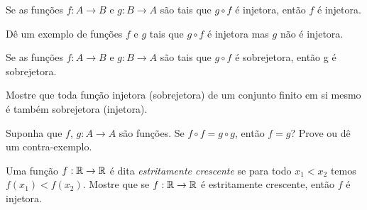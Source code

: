 \documentclass[12pt]{exam}
\begin{document}
    \vspace{.3cm}

    \questao{} Se as fun{\c c}{\~o}es $f : A \to B$ e $g : B\to A$ s{\~a}o
    tais que $g\circ f$ {\'e} injetora, ent{\~a}o $f$ {\'e} injetora.

    \vspace{.3cm}

    \questao{} Dê um exemplo de funções $f$ e $g$ tais que $g \circ f$ é injetora mas $g$ não é injetora.

    \vspace{.3cm}

    \questao{} Se as fun{\c c}{\~o}es $f : A \to B$ e $g : B\to A$ s{\~a}o
    tais que $g\circ f$ {\'e} sobrejetora, ent{\~a}o g {\'e} sobrejetora.

    \vspace{.3cm}

    \questao{} Mostre que toda fun{\c c}{\~a}o injetora (sobrejetora) de um conjunto finito em si mesmo {\'e} tamb{\'e}m sobrejetora (injetora).

    \vspace{.3cm}

    \questao{} Suponha que $f$, $g : A \to A$ são funções. Se $f \circ f = g \circ g$, então $f = g$? Prove ou dê um contra-exemplo.

    \vspace{.3cm}

    \questao{} Uma função $f : \mathbb{R} \to \mathbb{R}$ é dita \textit{estritamente crescente} se para todo $x_1 < x_2$ temos $f(x_1) < f(x_2)$. Mostre que se $f : \mathbb{R} \to \mathbb{R}$ é estritamente crescente, então $f$ é injetora.
\end{document}
